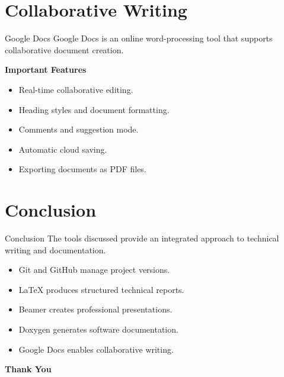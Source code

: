 \documentclass[aspectratio=169,11pt]{beamer}
\begin{document}
\section{Collaborative Writing}

\begin{frame}{Google Docs}
    Google Docs is an online word-processing tool
    that supports collaborative document creation.

    \textbf{Important Features}
    \begin{itemize}
        \item Real-time collaborative editing.
        \item Heading styles and document formatting.
        \item Comments and suggestion mode.
        \item Automatic cloud saving.
        \item Exporting documents as PDF files.
    \end{itemize}
\end{frame}

\section{Conclusion}

\begin{frame}{Conclusion}
    The tools discussed provide an integrated approach
    to technical writing and documentation.

    \begin{itemize}
        \item Git and GitHub manage project versions.
        \item LaTeX produces structured technical reports.
        \item Beamer creates professional presentations.
        \item Doxygen generates software documentation.
        \item Google Docs enables collaborative writing.
    \end{itemize}

    \vspace{0.5cm}
    \centering
    \textbf{Thank You}
\end{frame}
\end{document}
